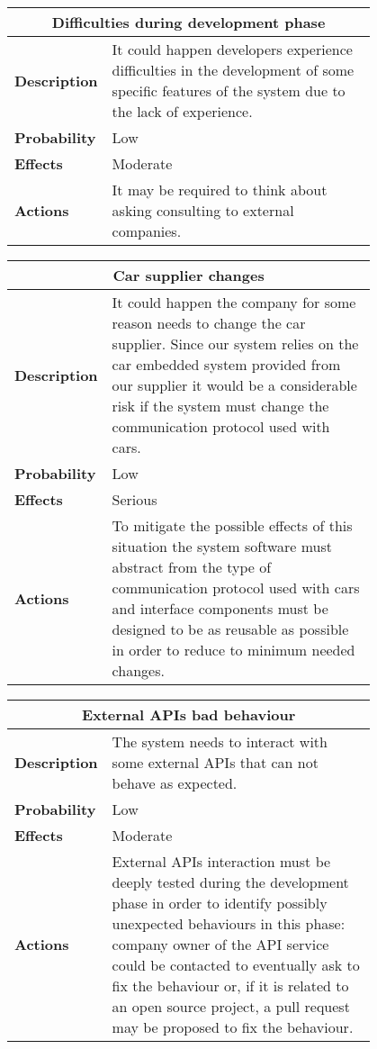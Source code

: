 \begin{longtable}{lp{0.8\linewidth}}
\multicolumn{2}{c}{\textbf{Difficulties during development phase}}\\
\toprule
\textbf{Description}& It could happen developers experience difficulties in the development of some specific features of the system due to the lack of experience. \\
\midrule
\textbf{Probability}&Low\\
\midrule
\textbf{Effects}&Moderate\\
\midrule
\textbf{Actions}& It may be required to think about asking consulting to external companies.\\
\bottomrule
\end{longtable}

\begin{longtable}{lp{0.8\linewidth}}
\multicolumn{2}{c}{\textbf{Car supplier changes}}\\
\toprule
\textbf{Description}& It could happen the company for some reason needs to change the car supplier. Since our system relies on the car embedded system provided from our supplier it would be a considerable risk if the system must change the communication protocol used with cars. \\
\midrule
\textbf{Probability}&Low\\
\midrule
\textbf{Effects}&Serious\\
\midrule
\textbf{Actions}& To mitigate the possible effects of this situation the system software must abstract from the type of communication protocol used with cars and interface components must be designed to be as reusable as possible in order to reduce to minimum needed changes.\\
\bottomrule
\end{longtable}

\begin{longtable}{lp{0.8\linewidth}}
\multicolumn{2}{c}{\textbf{External APIs bad behaviour}}\\
\toprule
\textbf{Description}& The system needs to interact with some external APIs that can not behave as expected. \\
\midrule
\textbf{Probability}&Low\\
\midrule
\textbf{Effects}&Moderate\\
\midrule
\textbf{Actions}& External APIs interaction must be deeply tested during the development phase in order to identify possibly unexpected behaviours in this phase: company owner of the API service could be contacted to eventually ask to fix the behaviour or, if it is related to an open source project, a pull request may be proposed to fix the behaviour. \\
\bottomrule
\end{longtable}

